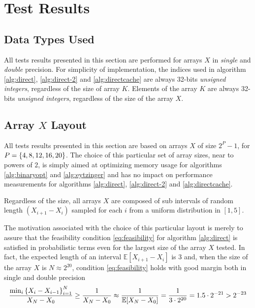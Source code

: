 \documentclass[preprint,1p,times]{elsarticle}
\begin{document}
\section{Test Results}
\label{sec:results}

\subsection{Data Types Used}
All tests results presented in this section are performed for arrays $X$ in \textit{single} and \textit{double} precision. 
For simplicity of implementation, the indices used in algorithm \ref{alg:direct}, \ref{alg:direct-2} and \ref{alg:directcache} are always 32-bits \textit{unsigned integers}, regardless of the size of array $K$. Elements of the array $K$ are always 32-bits \textit{unsigned integers}, regardless of the size of the array $X$.

\subsection{Array $X$ Layout}
\label{sec:arrayx} 
All tests results presented in this section are based on arrays $X$ of size $2^P-1$, for $P=\left \{ 4,8,12,16,20 \right \}$. The choice of this particular set of array sizes, near to powers of $2$, is simply aimed at optimizing memory usage for algorithms \ref{alg:binaryopt} and \ref{alg:eytzinger} and has no impact on performance measurements for algorithms \ref{alg:direct}, \ref{alg:direct-2} and \ref{alg:directcache}.

Regardless of the size, all arrays $X$ are composed of sub intervals of random length $(X_{i+1}-X_i)$ sampled for each $i$ from a uniform distribution in $[1,5]$.

The motivation associated with the choice of this particular layout is merely to assure that the feasibility condition \eqref{eq:feasibility} for algorithm \ref{alg:direct} is satisfied in probabilistic terms even for the largest size of the array $X$ tested. In fact, the expected length of an interval $\mathbb{E}[X_{i+1}-X_i]$ is $3$ and, when the size of the array $X$ is $N \approx 2^{20}$, condition \eqref{eq:feasibility} holds with good margin both in single and double precision
\begin{align*}
\frac{\min_i\left \{  X_{i}-X_{i-1}  \right \}_{i=1}^{N}}{X_N-X_0}
\geq \frac{1}{X_N-X_0}
\approx \frac{1}{\mathbb{E}[X_N-X_0]}
=\frac{1}{3 \cdot 2^{20}} 
= 1.5 \cdot 2^{-21}
> 2^{-23}
\end{align*}
\end{document}
